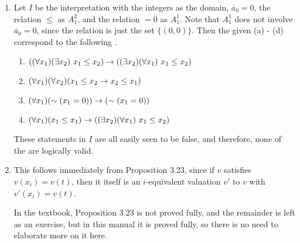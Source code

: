 \begin{enumerate}
  \item %
    Let \(I\) be the interpretation with the integers as the domain, \(\overline{a}_0 = 0\), the relation \(\leq\) as \(A^2_1\), and the relation \(=0\) as \(A^1_1\). Note that \(A^1_1\) does not involve \(\overline{a}_0 = 0\), since the relation is just the set \(\{(0, 0)\}\). Then the given \wfs{} (a) - (d) correspond to the following \wfs{}.
    \begin{enumerate}[align=left]
      \item \(((\forall x_1)(\exists x_2)\ x_1 \leq x_2) \rightarrow ((\exists x_2)(\forall x_1)\ x_1 \leq x_2)\)
      \item \((\forall x_1)(\forall x_2)(x_1 \leq x_2 \rightarrow x_2 \leq x_1)\)
      \item \((\forall x_1)(\sim(x_1 = 0)) \rightarrow (\sim(x_1 = 0))\)
      \item \((\forall x_1)(x_1 \leq x_1) \rightarrow ((\exists x_2)(\forall x_1)\ x_1 \leq x_2)\)
    \end{enumerate}
    These statements in \(I\) are all easily seen to be false, and therefore, none of the \wfs{} are logically valid.
    
  \item %
    This follows immediately from Proposition 3.23, since if \(v\) satisfies \(v(x_i) = v(t)\), then it itself is an \(i\)-equivalent valuation \(v'\) to \(v\) with \(v'(x_i) = v(t)\).

    \note{} In the textbook, Proposition 3.23 is not proved fully, and the remainder is left as an exercise, but in this manual it is proved fully, so there is no need to elaborate more on it here.
\end{enumerate}

